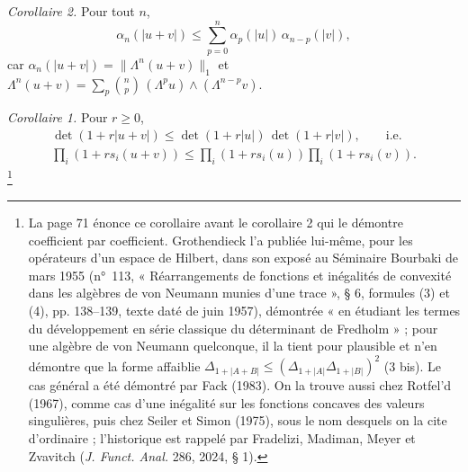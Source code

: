 \documentclass[11pt,a4paper]{article}
\begin{document}
\emph{Corollaire 2.} Pour tout $n$,
\[
  \alpha_n(|u+v|) \leq \sum_{p=0}^{n} \alpha_p(|u|)\,\alpha_{n-p}(|v|) ,
\]
car $\alpha_n(|u+v|) = \|\Lambda^n(u+v)\|_1$ et $\Lambda^n(u+v) =
\sum_p \binom{n}{p}\,(\Lambda^p u) \wedge (\Lambda^{n-p} v)$.

\emph{Corollaire 1.} Pour $r \geq 0$,
\begin{gather*}
  \det(1 + r|u+v|) \leq \det(1 + r|u|)\,\det(1 + r|v|), \qquad\text{i.e.} \\
  \prod_i (1 + r s_i(u+v)) \leq \prod_i (1 + r s_i(u)) \prod_i (1 + r s_i(v)) .
\end{gather*}
\footnote{La page 71 énonce ce corollaire avant le corollaire 2 qui le
démontre coefficient par coefficient. Grothendieck l'a publiée lui-même, pour les
opérateurs d'un espace de Hilbert, dans son exposé au Séminaire Bourbaki de mars 1955 (n°~113,
« Réarrangements de fonctions et inégalités de convexité dans les algèbres
de von Neumann munies d'une trace », § 6, formules (3) et (4), pp. 138--139,
texte daté de juin 1957), démontrée « en étudiant les termes du développement en série classique du déterminant de Fredholm » ; pour une algèbre de von Neumann quelconque, il la tient pour plausible et n'en démontre que la forme affaiblie $\Delta_{1+|A+B|} \leq (\Delta_{1+|A|}\Delta_{1+|B|})^{2}$ (3 bis). Le cas général a été démontré par Fack (1983). On la trouve aussi chez Rotfel'd (1967), comme
cas d'une inégalité sur les fonctions concaves des valeurs singulières, puis
chez Seiler et Simon (1975), sous le nom desquels on la cite d'ordinaire ;
l'historique est rappelé par Fradelizi, Madiman, Meyer et Zvavitch
(\emph{J. Funct. Anal.} 286, 2024, § 1).}
\end{document}
